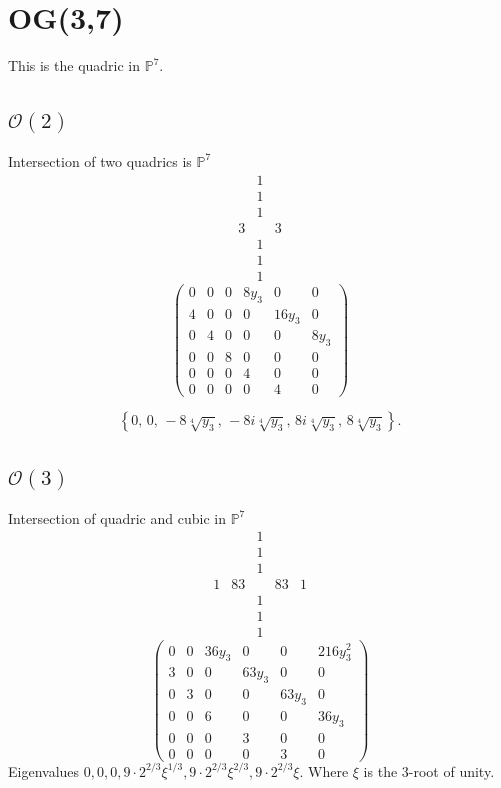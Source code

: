 \documentclass[11pt]{amsart}
\begin{document}
\section{OG(3,7)}

This is the quadric in $\mathbb{P}^7$.


\subsection{$\mathcal{O}(2)$}
Intersection of two quadrics is $\mathbb{P}^7$
\[
\begin{array}{ccc}
     &1&  \\
     &1&\\
     &1&\\
     3&&3\\
     &1&\\
     &1&\\
     &1&
\end{array}
\]
\[
\begin{pmatrix}
0 & 0 & 0 & 8y_{3} & 0 & 0 \\
4 & 0 & 0 & 0 & 16y_{3} & 0 \\
0 & 4 & 0 & 0 & 0 & 8y_{3} \\
0 & 0 & 8 & 0 & 0 & 0 \\
0 & 0 & 0 & 4 & 0 & 0 \\
0 & 0 & 0 & 0 & 4 & 0
\end{pmatrix}
\]

\[
\left\{
0,\,
0,\,
-8\sqrt[4]{y_{3}},\,
-8i\sqrt[4]{y_{3}},\,
8i\sqrt[4]{y_{3}},\,
8\sqrt[4]{y_{3}}
\right\}.
\]

\subsection{$\mathcal{O}(3)$}
Intersection of quadric and cubic in $\mathbb{P}^7$
\[
\begin{array}{ccccc}
     &&1&&  \\
     &&1&&\\
     &&1&&\\
     1&83&&83&1\\
        &&1&&  \\
     &&1&&\\
     &&1&&
\end{array}
\]
\[
\begin{pmatrix}
0 & 0 & 36y_{3} & 0 & 0 & 216y_{3}^{2} \\
3 & 0 & 0 & 63y_{3} & 0 & 0 \\
0 & 3 & 0 & 0 & 63y_{3} & 0 \\
0 & 0 & 6 & 0 & 0 & 36y_{3} \\
0 & 0 & 0 & 3 & 0 & 0 \\
0 & 0 & 0 & 0 & 3 & 0
\end{pmatrix}
\]
Eigenvalues $0,0,0,9 \cdot 2^{2/3}\xi^{1/3} , 9\cdot 2^{2/3}\xi^{2/3} , 9\cdot 2^{2/3}\xi$. Where $\xi$ is the 3-root of unity.
\end{document}
